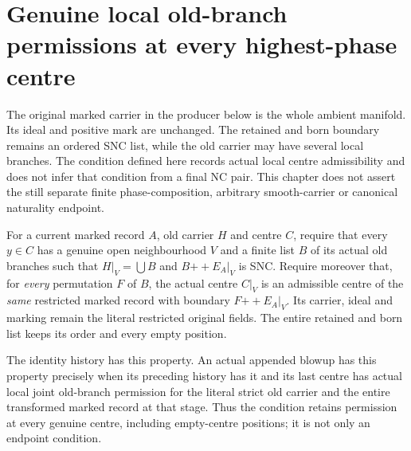 \section{Genuine local old-branch permissions at every highest-phase centre}
\label{sec:nc-highest-phase-permissions}

The original marked carrier in the producer below is the whole ambient
manifold. Its ideal and positive mark are unchanged. The retained and
born boundary remains an ordered SNC list, while the old carrier may
have several local branches. The condition defined here records actual
local centre admissibility and does not infer that condition from a
final NC pair. This chapter does not assert the still separate finite
phase-composition, arbitrary smooth-carrier or canonical naturality
endpoint.

\begin{definition}
\label{hir:nc-local-joint-branch-centre-permission}
\leanok
For a current marked record $A$, old carrier $H$ and centre $C$, require
that every $y\in C$ has a genuine open neighbourhood $V$ and a finite
list $B$ of its actual old branches such that $H|_V=\bigcup B$ and
$B\mathbin{+\!+}E_A|_V$ is SNC. Require moreover that, for \emph{every}
permutation $F$ of $B$, the actual centre $C|_V$ is an admissible centre
of the \emph{same} restricted marked record with boundary
$F\mathbin{+\!+}E_A|_V$. Its carrier, ideal and marking remain the
literal restricted original fields. The entire retained and born list
keeps its order and every empty position.
\end{definition}

\begin{definition}
\label{hir:nc-joint-branch-permission-history}
\leanok
The identity history has this property. An actual appended blowup has
this property precisely when its preceding history has it and its last
centre has actual local joint old-branch permission for the literal
strict old carrier and the entire transformed marked record at that
stage. Thus the condition retains permission at every genuine centre,
including empty-centre positions; it is not only an endpoint condition.
\end{definition}

